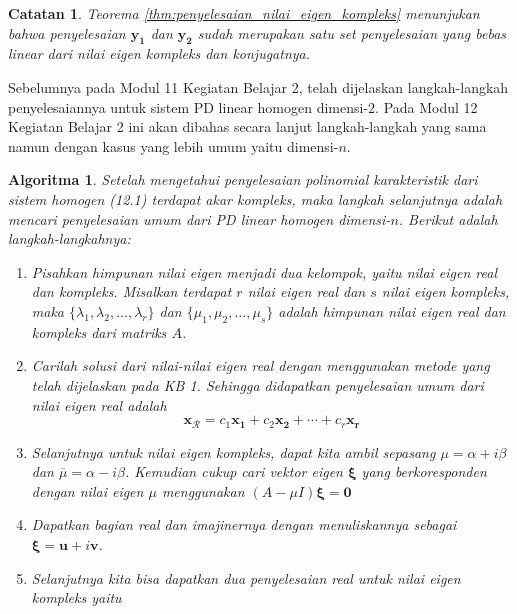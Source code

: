 \documentclass[a4paper]{article}
\theoremstyle{definisi}
\newtheorem{algoritma}{Algoritma}[section]
\newtheorem{catatan}{Catatan}[section]
\newcommand{\bfxi}{\boldsymbol{\xi}}
\numberwithin{equation}{section}
\begin{document}
  \begin{catatan}
    Teorema \ref{thm:penyelesaian_nilai_eigen_kompleks} menunjukan bahwa penyelesaian $\mathbf{y_1}$ dan $\mathbf{y_2}$ sudah merupakan satu set penyelesaian yang bebas linear dari nilai eigen kompleks dan konjugatnya.
  \end{catatan}

  Sebelumnya pada Modul 11 Kegiatan Belajar 2, telah dijelaskan langkah-langkah penyelesaiannya untuk sistem PD linear homogen dimensi-$2$. Pada Modul 12 Kegiatan Belajar 2 ini akan dibahas secara lanjut langkah-langkah yang sama namun dengan kasus yang lebih umum yaitu dimensi-$n$. 

  \begin{algoritma}\label{algoritma}
  Setelah mengetahui penyelesaian polinomial karakteristik dari sistem homogen (12.1) terdapat akar kompleks, maka langkah selanjutnya adalah mencari penyelesaian umum dari PD linear homogen dimensi-$n$. Berikut adalah langkah-langkahnya:
  \begin{enumerate}[label=Langkah \arabic*: ,leftmargin=*]
    \item Pisahkan himpunan nilai eigen menjadi dua kelompok, yaitu nilai eigen real dan kompleks. Misalkan terdapat $r$ nilai eigen real dan $s$ nilai eigen kompleks, maka $\{\lambda_1, \lambda_2, \ldots, \lambda_r\}$ dan $\{\mu_1, \mu_2, \ldots, \mu_s\}$ adalah himpunan nilai eigen real dan kompleks dari matriks $A$.
    \item Carilah solusi dari nilai-nilai eigen real dengan menggunakan metode yang telah dijelaskan pada KB 1. Sehingga didapatkan penyelesaian umum dari nilai eigen real adalah
    \begin{equation}\label{eq:penyelesaian_nilai_eigen_real}
      \mathbf{x}_\mathcal{R}=c_1\mathbf{x_1}+c_2\mathbf{x_2}+\cdots+c_r\mathbf{x_r}
    \end{equation}
    \item Selanjutnya untuk nilai eigen kompleks, dapat kita ambil sepasang $\mu = \alpha + i\beta$ dan $\overline{\mu} = \alpha - i\beta$. Kemudian cukup cari vektor eigen $\bfxi$ yang berkoresponden dengan nilai eigen $\mu$ menggunakan $(A-\mu I)\bfxi = \mathbf{0}$
    \item Dapatkan bagian real dan imajinernya dengan menuliskannya sebagai $\bfxi = \mathbf{u} + i\mathbf{v}$.
    \item Selanjutnya kita bisa dapatkan dua penyelesaian real untuk nilai eigen kompleks yaitu
    \begin{equation}\label{eq:penyelesaian_vektor_eigen}

\end{equation}
\end{enumerate}
\end{algoritma}
\end{document}
